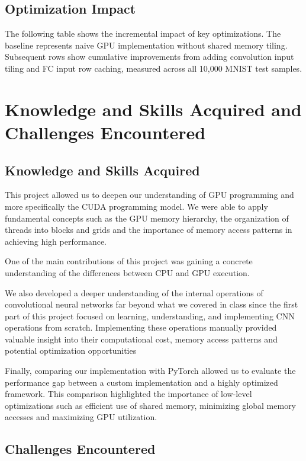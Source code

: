 \documentclass[11pt]{article}
\begin{document}
\subsection{Optimization Impact}
The following table shows the incremental impact of key optimizations. The baseline represents naive GPU implementation without shared memory tiling. Subsequent rows show cumulative improvements from adding convolution input tiling and FC input row caching, measured across all 10,000 MNIST test samples.





\section{Knowledge and Skills Acquired and Challenges Encountered}

\subsection{Knowledge and Skills Acquired}

This project allowed us to deepen our understanding of GPU programming and more specifically the CUDA programming model. We were able to apply fundamental concepts such as the GPU memory hierarchy, the organization of threads into blocks and grids and the importance of memory access patterns in achieving high performance.

One of the main contributions of this project was gaining a concrete understanding of the differences between CPU and GPU execution.

We also developed a deeper understanding of the internal operations of convolutional neural networks far beyond what we covered in class since the first part of this project focused on learning, understanding, and implementing CNN operations from scratch. Implementing these operations manually provided valuable insight into their computational cost, memory access patterns and potential optimization opportunities

Finally, comparing our implementation with PyTorch allowed us to evaluate the performance gap between a custom implementation and a highly optimized framework. This comparison highlighted the importance of low-level optimizations such as efficient use of shared memory, minimizing global memory accesses and maximizing GPU utilization.

\subsection{Challenges Encountered}
\end{document}
